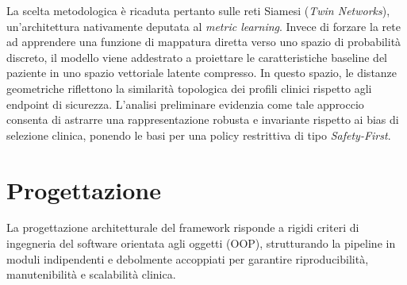 \documentclass{article}
\begin{document}
La scelta metodologica è ricaduta pertanto sulle reti Siamesi (\textit{Twin Networks}), un'architettura nativamente deputata al \textit{metric learning}. Invece di forzare la rete ad apprendere una funzione di mappatura diretta verso uno spazio di probabilità discreto, il modello viene addestrato a proiettare le caratteristiche baseline del paziente in uno spazio vettoriale latente compresso. In questo spazio, le distanze geometriche riflettono la similarità topologica dei profili clinici rispetto agli endpoint di sicurezza. L'analisi preliminare evidenzia come tale approccio consenta di astrarre una rappresentazione robusta e invariante rispetto ai bias di selezione clinica, ponendo le basi per una policy restrittiva di tipo \textit{Safety-First}.

\section{Progettazione}
La progettazione architetturale del framework risponde a rigidi criteri di ingegneria del software orientata agli oggetti (OOP), strutturando la pipeline in moduli indipendenti e debolmente accoppiati per garantire riproducibilità, manutenibilità e scalabilità clinica.
\end{document}
